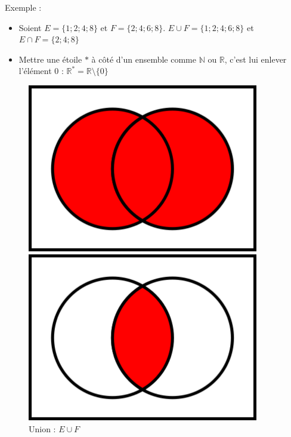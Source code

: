 \documentclass[10pt,a4paper,oneside]{book}
\newcommand{\N}{\mathbb{N}}
\newcommand{\R}{\mathbb{R}}
\begin{document}
Exemple : \begin{itemize}
    \item Soient $E = \{1;2;4;8\}$ et $F = \{2;4;6;8\}$. $E \cup F = \{1;2;4;6;8\}$ et $E \cap F = \{2;4;8\}$
    \item Mettre une étoile $*$ à côté d'un ensemble comme $\N$ ou $\R$, c'est lui enlever l'élément $0$ :  $\R^* = \R \setminus \{0\}$
\end{itemize}

    

\begin{figure}
    \centering
    \begin{minipage}{0.3\textwidth}
        \centering
        \includegraphics[width=0.9\textwidth]{Venn0111.png} 
        \caption{Union :  $E \cup F$}
    \end{minipage}
    \begin{minipage}{0.3\textwidth}
        \centering
        \includegraphics[width=0.9\textwidth]{Venn0001.png} 

\end{minipage}
\end{figure}
\end{document}
